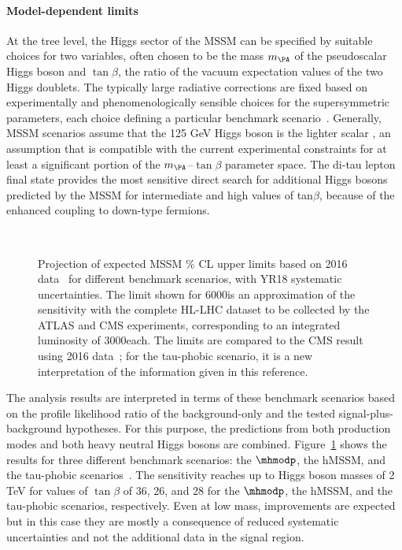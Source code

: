 \paragraph{Model-dependent limits}
\label{sec:model_dep}
%
At the tree level, the Higgs sector of the MSSM can be specified by suitable choices for two variables, 
often chosen to be the mass $m_{\PA}$ of the pseudoscalar Higgs boson
and $\tan\beta$, the ratio of the \mbox{vacuum} expectation
values of the two Higgs doublets.
The typically large radiative corrections are 
fixed based on experimentally and phenomenologically sensible choices for
the supersymmetric parameters, each choice defining a particular benchmark scenario~\cite{Carena:2013ytb}.
Generally, MSSM scenarios assume that the 125 GeV Higgs boson is the lighter scalar \Ph, 
an assumption that is compatible with the current experimental constraints 
for at least a significant portion of the $m_{\PA}$--$\tan\beta$ parameter space.
The di-tau lepton final state provides the most sensitive direct search for additional
Higgs bosons predicted by the MSSM for intermediate and high values of tan$\beta$, 
because of the enhanced
coupling to down-type fermions.
%
\begin{figure}[htbp]
\begin{center}
\\
\end{center}
\caption{Projection of expected MSSM \% CL upper limits based on 2016 data~\cite{HIG-17-020} for different benchmark 
scenarios, with YR18 systematic uncertainties. The limit shown for 6000\fbinv is an approximation of the sensitivity with 
the complete HL-LHC dataset to be collected by the ATLAS and CMS experiments, corresponding to an integrated luminosity of 3000\fbinv each. 
The limits are compared to the CMS result using 2016 data~\cite{HIG-17-020}; for the tau-phobic scenario, 
it is a new interpretation of the information given in this reference. 
}
\label{fig:model_mssm1}
\end{figure}

The analysis results are interpreted in terms of these benchmark scenarios based on the profile likelihood ratio of the 
background-only and the tested signal-plus-background hypotheses. 
For this purpose, the predictions from both production modes and both heavy neutral Higgs bosons are combined.
Figure~\ref{fig:model_mssm1} shows the results 
for three different benchmark scenarios:
the $\mhmodp$, the hMSSM, and the tau-phobic scenarios~\cite{HIG-17-020}.
The sensitivity reaches up to Higgs boson masses
of 2 TeV for values of $\tan \beta$ of 36, 26, and 28
for the $\mhmodp$, the hMSSM, and the tau-phobic scenarios,
respectively.
Even at low mass, improvements are expected but in this case they are mostly 
a consequence of reduced systematic uncertainties and not 
the additional data in the signal region.